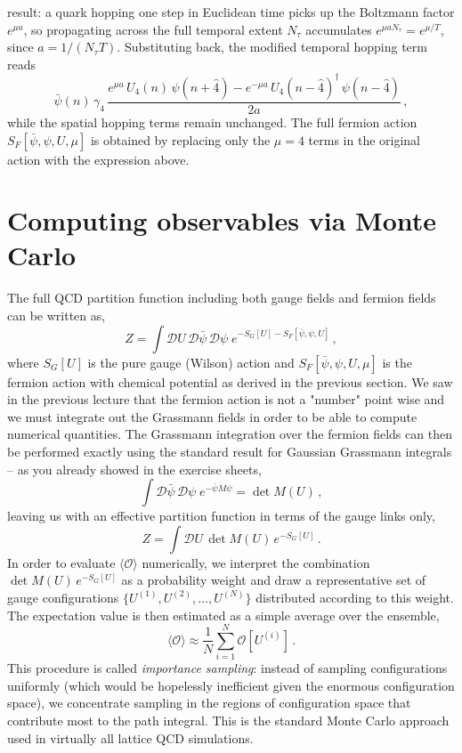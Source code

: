 \documentclass[11pt]{article}
\theoremstyle{definition}
\begin{document}
result: a quark hopping one step in Euclidean time picks up the Boltzmann
factor $e^{\mu a}$, so propagating across the full temporal extent
$N_\tau$ accumulates $e^{\mu a N_\tau} = e^{\mu/T}$, since
$a = 1/(N_\tau T)$.
Substituting back, the modified temporal hopping term
reads
\begin{equation}
  \bar{\psi}(n)\,\gamma_4\,
  \frac{e^{\mu a}\,U_4(n)\,\psi(n+\hat{4})
        -e^{-\mu a}\,U_4(n-\hat{4})^{\dagger}\,\psi(n-\hat{4})}{2a}\,,
\end{equation}
while the spatial hopping terms remain unchanged. The full fermion action
$S_F[\bar{\psi},\psi,U,\mu]$ is obtained by replacing only the $\mu=4$
terms in the original action with the expression above.

\section{Computing observables via Monte Carlo}
The full QCD partition function including both gauge fields and fermion fields can be written as,
\begin{equation}\label{eqn:Z_full}
    Z = \int \mathcal{D}U \, \mathcal{D}\bar{\psi} \, \mathcal{D}\psi \; e^{-S_G[U] - S_F[\bar{\psi}, \psi, U]} \,,
\end{equation}
where $S_G[U]$ is the pure gauge (Wilson) action and $S_F[\bar{\psi}, \psi, U, \mu]$ is the fermion action with chemical potential as derived in the previous section. We saw in the previous lecture that the fermion action is not a "number" point wise and we must integrate out the Grassmann fields in order to be able to compute numerical quantities. The Grassmann integration over the fermion fields can then be performed exactly using the standard result for Gaussian Grassmann integrals -- as you already showed in the exercise sheets,
\begin{equation}
    \int \mathcal{D}\bar{\psi} \, \mathcal{D}\psi \; e^{-\bar{\psi} M \psi} = \det M(U) \,,
\end{equation}
leaving us with an effective partition function in terms of the gauge links only,
\begin{equation}\label{eqn:Z_latt}
    Z = \int \mathcal{D}U \, \det M(U) \, e^{-S_G[U]} \,.
\end{equation}
In order to evaluate $\langle \mathcal{O} \rangle$ numerically, we interpret the combination $\det M(U) \, e^{-S_G[U]}$ as a probability weight and draw a representative set of gauge configurations $\{U^{(1)}, U^{(2)}, \ldots, U^{(N)}\}$ distributed according to this weight. The expectation value is then estimated as a simple average over the ensemble,
\begin{equation}\label{eqn:MC_avg}
    \langle \mathcal{O} \rangle \approx \frac{1}{N} \sum_{i=1}^{N} \mathcal{O}[U^{(i)}] \,.
\end{equation}
This procedure is called \textit{importance sampling}: instead of sampling configurations uniformly (which would be hopelessly inefficient given the enormous configuration space), we concentrate sampling in the regions of configuration space that contribute most to the path integral. This is the standard Monte Carlo approach used in virtually all lattice QCD simulations.
\end{document}
